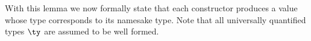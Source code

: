 {%


With this lemma we now formally state that each constructor
produces a value whose type corresponds to its namesake \ddc{} type.
Note that all universally quantified \ddc{} types $\ty$ are assumed
to be well formed.

}
